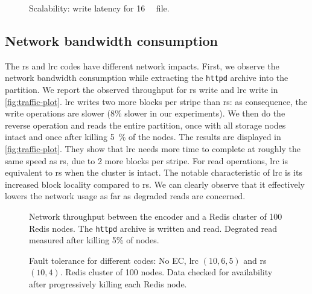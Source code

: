 \begin{figure}[t]
    \centering
    
    \caption{Scalability: write latency for \SI{16}{\mebi\byte} file.}
    \label{fig:latency-plot}
\end{figure}


\subsection{Network bandwidth consumption}
\label{subsec:network-traffic}
The \ac{rs} and \ac{lrc} codes have different network impacts.
First, we observe the network bandwidth consumption while extracting the \texttt{httpd} archive into the \SYS partition. We report the observed throughput for \ac{rs} write and \ac{lrc} write in \autoref{fig:traffic-plot}. \ac{lrc} writes two more blocks per stripe than \ac{rs}: as consequence, the write operations are slower (8\% slower in our experiments). %
We then do the reverse operation and reads the entire partition, once with all storage nodes intact and once after killing \SI{5}{\percent} of the nodes. The results are displayed in \autoref{fig:traffic-plot}. They show that \ac{lrc} needs more time to complete at roughly the same speed as \ac{rs}, due to 2 more blocks per stripe.
For read operations, \ac{lrc} is equivalent to \ac{rs} when the cluster is intact.
The notable characteristic of \ac{lrc} is its increased block locality compared to \ac{rs}.
We can clearly observe that it effectively lowers the network usage as far as degraded reads are concerned.
\begin{figure*}
    \centering
    
    \caption{Network throughput between the encoder and a Redis cluster of 100 Redis nodes. The \texttt{httpd} archive is written and read. Degrated read measured after killing 5\% of nodes.}
    \label{fig:traffic-plot}
\end{figure*}

\begin{figure}[ht]
    \centering
    
    \caption{Fault tolerance for different codes: No EC, \ac{lrc} $\left(10,6,5\right)$ and \ac{rs} $\left(10,4\right)$. Redis cluster of 100 nodes. Data checked for availability after progressively killing each Redis node.}
    \label{fig:checksum-plot}
\end{figure}

